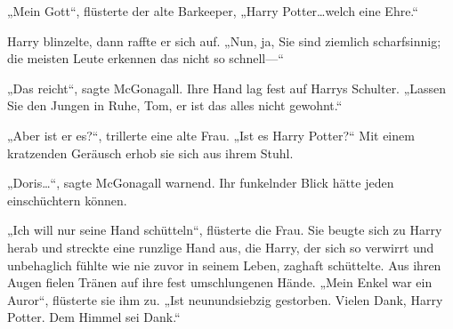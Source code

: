 „Mein Gott“, flüsterte der alte Barkeeper,
„Harry Potter…welch eine Ehre.“

Harry blinzelte, dann raffte er sich auf.
„Nun, ja, Sie sind ziemlich scharfsinnig; die meisten Leute erkennen das nicht so schnell—“

„Das reicht“, sagte McGonagall. Ihre Hand lag fest auf Harrys Schulter.
„Lassen Sie den Jungen in Ruhe, Tom, er ist das alles nicht gewohnt.“

„Aber ist er es?“, trillerte eine alte Frau.
„Ist es Harry Potter?“ Mit einem kratzenden Geräusch erhob sie sich aus ihrem Stuhl.

„Doris…“, sagte McGonagall warnend. Ihr funkelnder Blick hätte jeden einschüchtern können.

„Ich will nur seine Hand schütteln“, flüsterte die Frau. Sie beugte sich zu Harry herab und streckte eine runzlige Hand aus, die Harry, der sich so verwirrt und unbehaglich fühlte wie nie zuvor in seinem Leben, zaghaft schüttelte. Aus ihren Augen fielen Tränen auf ihre fest umschlungenen Hände.
„Mein Enkel war ein Auror“, flüsterte sie ihm zu.
„Ist neunundsiebzig gestorben. Vielen Dank, Harry Potter. Dem Himmel sei Dank.“

